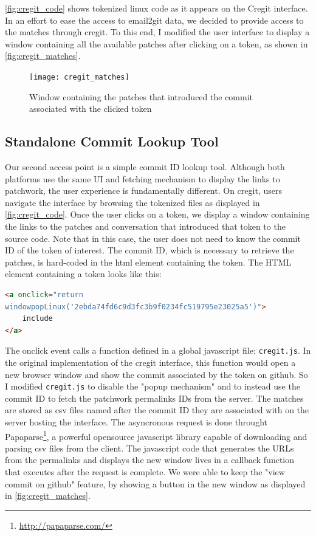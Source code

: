 \autoref{fig:cregit_code} shows tokenized linux code as it appears on the Cregit interface. In an effort to ease the access to email2git data, we decided to provide access to the matches through cregit. To this end, I modified the user interface to display a window containing all the available patches after clicking on a token, as shown in \autoref{fig:cregit_matches}. 

\begin{figure}[htb]
\centering
\texttt{[image: cregit\_matches]}
\caption{Window containing the patches that introduced the commit associated with the clicked token}
\label{fig:cregit_matches}
\end{figure}




\subsection{Standalone Commit Lookup Tool}



Our second access point is a simple commit ID lookup tool. Although both platforms use the same UI and fetching mechanism to display the links to patchwork, the user experience is fundamentally different. On cregit, users navigate the interface by browsing the tokenized files as displayed in \autoref{fig:cregit_code}. Once the user clicks on a token, we display a window containing the links to the patches and conversation that introduced that token to the source code. Note that in this case, the user does not need to know the commit ID of the token of interest. The commit ID, which is necessary to retrieve the patches, is hard-coded in the html element containing the token. The HTML element containing a token looks like this:

\begin{lstlisting}[language=HTML]
<a onclick="return 
windowpopLinux('2ebda74fd6c9d3fc3b9f0234fc519795e23025a5')">
	include
</a>
\end{lstlisting}

The onclick event calls a function defined in a global javascript file: \texttt{cregit.js}. In the original implementation of the cregit interface, this function would open a new browser window and show the commit associated by the token on github. So I modified \texttt{cregit.js} to disable the "popup mechanism" and to instead use the commit ID to fetch the patchwork permalinks IDs from the server. The matches are stored as csv files named after the commit ID they are associated with on the server hosting the interface. The asyncronous request is done throught Papaparse\footnote{\url{http://papaparse.com/}}, a powerful opensource javascript library capable of downloading and parsing csv files from the client. The javascript code that generates the URLs from the permalinks and displays the new window lives in a callback function that executes after the request is complete. We were able to keep the "view commit on github" feature, by showing a button in the new window as displayed in \autoref{fig:cregit_matches}.  

